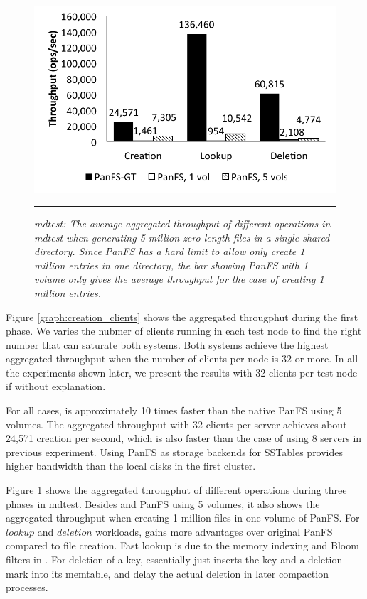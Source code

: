 \begin{figure}[t]  %
\centerline{\includegraphics[scale=0.7]{./figs/mdtest}}
\vspace{10pt}
\caption{\normalsize
\textit{mdtest:
The average aggregated throughput of different operations in mdtest
when generating 5 million zero-length files in a single shared directory.
Since PanFS has a hard limit to allow only create 1 million entries
in one directory, the bar showing PanFS with 1 volume only gives
the average throughput for the case of creating 1 million entries.
}
}
\vspace{10pt}
\hrule
\label{graph:mdtest_ops}
\end{figure}       %


Figure \ref{graph:creation_clients} shows the aggregated througphut during
the first phase. We varies the nubmer of clients running in each test node
to find the right number that can saturate both systems.
Both systems achieve the highest aggregated throughput when the number
of clients per node is 32 or more. In all the experiments shown later,
we present the results with 32 clients per test node if without explanation.

For all cases, \sys  is approximately 10 times faster than the native PanFS
using 5 volumes. The aggregated throughput with 32 clients per server
achieves about 24,571 creation per second, which is also faster than
the case of using 8 servers in previous experiment. Using PanFS as storage
backends for SSTables provides higher bandwidth than the local disks in
the first cluster.

Figure \ref{graph:mdtest_ops} shows the aggregated througphut of
different operations during three phases in mdtest.
Besides \sys and PanFS using 5 volumes, it also shows
the aggregated throughput when creating 1 million files in one volume of PanFS.
For $lookup$ and $deletion$ workloads,
\sys gains more advantages over original PanFS compared to file creation.
Fast lookup is due to the memory indexing and Bloom filters in \ldb.
For deletion of a key, \ldb essentially just inserts the key and a deletion mark
into its memtable, and delay the actual deletion in later compaction processes.


